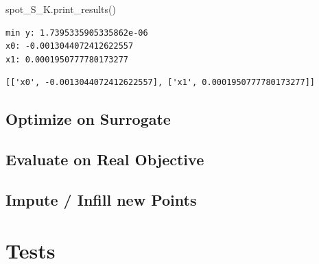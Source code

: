 \documentclass[
  letterpaper,
  DIV=11,
  numbers=noendperiod]{scrreprt}
\newenvironment{Shaded}{\begin{snugshade}}{\end{snugshade}}
\newcommand{\NormalTok}[1]{\textcolor[rgb]{0.00,0.23,0.31}{#1}}
\begin{document}
\begin{Shaded}
\begin{Highlighting}[]
\NormalTok{spot\_S\_K.print\_results()}
\end{Highlighting}
\end{Shaded}

\begin{verbatim}
min y: 1.7395335905335862e-06
x0: -0.0013044072412622557
x1: 0.0001950777780173277
\end{verbatim}

\begin{verbatim}
[['x0', -0.0013044072412622557], ['x1', 0.0001950777780173277]]
\end{verbatim}

\hypertarget{optimize-on-surrogate}{%
\subsection{Optimize on Surrogate}\label{optimize-on-surrogate}}

\hypertarget{evaluate-on-real-objective}{%
\subsection{Evaluate on Real
Objective}\label{evaluate-on-real-objective}}

\hypertarget{impute-infill-new-points}{%
\subsection{Impute / Infill new Points}\label{impute-infill-new-points}}

\hypertarget{tests}{%
\section{Tests}\label{tests}}
\end{document}
